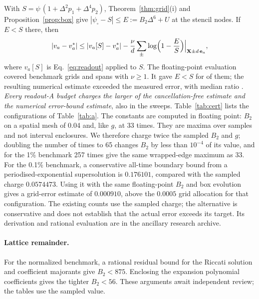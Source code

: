 \documentclass[11pt,a4paper]{article}
\theoremstyle{remark}
\newcommand{\X}{\mathbf X}
\begin{document}
With $S=\psi\,(1+\Delta^2p_1+\Delta^4p_2)$, Theorem~\ref{thm:grid}(i) and
Proposition~\ref{prop:box} give $|\psi_\square-S|\le E:=B_2\Delta^6+U$ at the stencil
nodes. If $E<S$ there, then
\begin{equation}
 |v_a-v_a^*|\le|v_a[S]-v_a^*|-\frac\nu d\sum_{\pm}
 \log\Bigl(1-\frac ES\Bigr)\Big|_{\X\pm d\,\mathbf e_a},
 \label{eq:cert}
\end{equation}
where $v_a[S]$ is Eq.~\eqref{eq:readout} applied to $S$. The floating-point evaluation
covered \GridEstimateTotal{} benchmark grids and spans with $\nu\ge1$. It gave $E<S$ for
\GridEstimateCount{} of them; the resulting numerical estimate exceeded the measured error,
with median ratio \GridEstimateMedian. \emph{Every readout-A budget charges the larger of the
cancellation-free estimate and the numerical error-bound estimate}, also in the sweeps.
Table~\ref{tab:cert} lists the configurations of Table~\ref{tab:a}. The constants are
computed in floating point: $B_2$ on a spatial mesh of 0.04 and, like $g$, at 33 times.
They are maxima over samples and not interval enclosures. We therefore charge twice the
sampled $B_2$ and $g$; doubling the number of times to 65 changes $B_2$ by less than
$10^{-4}$ of its value, and for the 1\% benchmark 257 times give the same wrapped-edge maximum as 33.
For the 0.1\% benchmark, a conservative all-time boundary bound from a
periodised-exponential supersolution is $0.176101$, compared with the sampled
charge $0.0574473$. Using it with the same floating-point $B_2$ and box
evolution gives a grid-error estimate of $0.000910$, above the $0.0005$ grid
allocation for that configuration. The existing counts use the sampled charge;
the alternative is conservative and does not establish that the actual error
exceeds its target. Its derivation and rational evaluation are in the ancillary
research archive.

\paragraph{Lattice remainder.}
For the normalized benchmark, a rational residual bound for the Riccati
solution and coefficient majorants give $B_2<875$. Enclosing the expansion
polynomial coefficients gives the tighter $B_2<56$. These arguments await
independent review; the tables use the sampled value.
\end{document}
